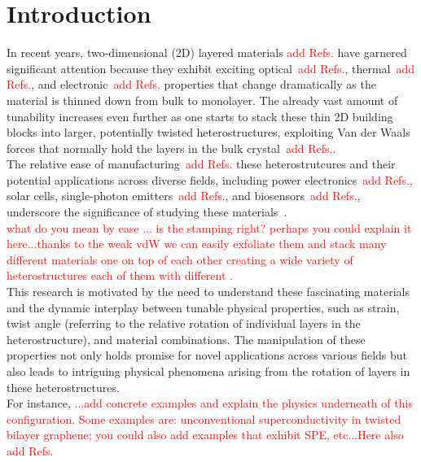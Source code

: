 \chapter{Introduction}
%
In recent years, two-dimensional (2D) layered materials \textcolor{red}{add Refs.} have garnered significant attention because they exhibit exciting optical~\textcolor{red}{add Refs.}, thermal~\textcolor{red}{add Refs.}, and electronic~\textcolor{red}{add Refs.} properties that change dramatically as the material is thinned down from bulk to monolayer.
%
The already vast amount of tunability increases even further as one starts to stack these thin 2D building blocks into larger, potentially twisted heterostructures, exploiting Van der Waals forces that normally hold the layers in the bulk crystal~\textcolor{red}{add Refs.}.\\

The relative ease of manufacturing~\textcolor{red}{add Refs.} these heterostrutcures and their potential applications across diverse fields, including power electronics~\textcolor{red}{add Refs.}, solar cells,  single-photon emitters~\textcolor{red}{add Refs.}, and biosensors~\textcolor{red}{add Refs.}, underscore the significance of studying these materials~\cite{LI2016322, https://doi.org/10.1002/smll.202107059}.\\ \textcolor{red}{what do you mean by ease ... is the stamping right? perhaps you could explain it here...thanks to the weak vdW we can easily exfoliate them and stack many different materials one on top of each other creating a wide variety of heterostructures each of them with different .}\\

This research is motivated by the need to understand these fascinating materials and the dynamic interplay between tunable physical properties, such as strain, twist angle (referring to the relative rotation of individual layers in the heterostructure), and material combinations. The manipulation of these properties not only holds promise for novel applications across various fields but also leads to intriguing physical phenomena arising from the rotation of layers in these heterostructures.\\

For instance, \textcolor{red}{...add concrete examples and explain the physics underneath of this configuration. Some examples are: unconventional superconductivity in twisted bilayer graphene; you could also add examples that exhibit SPE, etc...Here also add Refs.}\\

